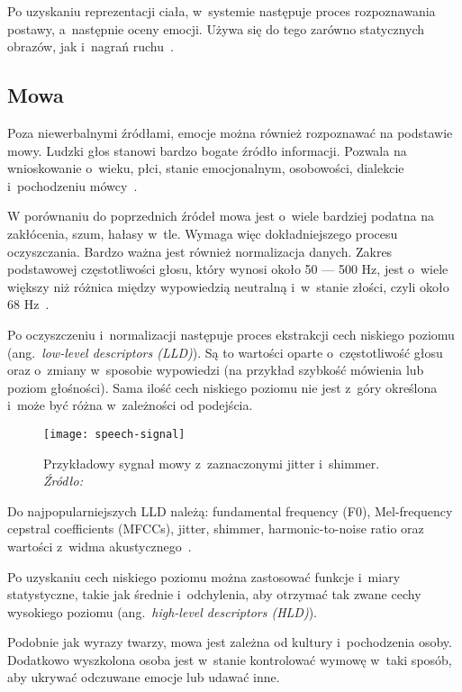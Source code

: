 Po uzyskaniu reprezentacji ciała, w~systemie następuje proces rozpoznawania postawy, a~następnie oceny emocji.
Używa się do tego zarówno statycznych obrazów, jak i~nagrań ruchu~\cite{Noroozi2021, Kleinsmith2013}.


\subsection{Mowa}\label{subsec:mowa}

Poza niewerbalnymi źródłami, emocje można również rozpoznawać na podstawie mowy.
Ludzki głos stanowi bardzo bogate źródło informacji.
Pozwala na wnioskowanie o~wieku, płci, stanie emocjonalnym, osobowości, dialekcie i~pochodzeniu mówcy~\cite{Wani2021}.

W porównaniu do poprzednich źródeł mowa jest o~wiele bardziej podatna na zakłócenia, szum, hałasy w~tle.
Wymaga więc dokładniejszego procesu oczyszczania.
Bardzo ważna jest również normalizacja danych.
Zakres podstawowej częstotliwości głosu, który wynosi około 50 — 500 Hz, jest o~wiele większy niż różnica między wypowiedzią neutralną i~w~stanie złości, czyli około 68 Hz~\cite{Calvo2015}.

Po oczyszczeniu i~normalizacji następuje proces ekstrakcji cech niskiego poziomu (ang.~\textit{low-level descriptors (LLD)}).
Są to wartości oparte o~częstotliwość głosu oraz o~zmiany w~sposobie wypowiedzi (na przykład szybkość mówienia lub poziom głośności).
Sama ilość cech niskiego poziomu nie jest z~góry określona i~może być różna w~zależności od podejścia.

\begin{figure}[h]
    \centering
    \texttt{[image: speech-signal]}
    \caption{Przykładowy sygnał mowy z~zaznaczonymi jitter i~shimmer. \textit{Źródło:~\cite{Teixeira2013}}}
    \label{fig:speech-signal}
\end{figure}

Do najpopularniejszych LLD należą: fundamental frequency (F0), Mel-frequency cepstral coefficients (MFCCs), jitter, shimmer, harmonic-to-noise ratio oraz wartości z~widma akustycznego~\cite{Calvo2015, Abdelwahab2014}.

Po uzyskaniu cech niskiego poziomu można zastosować funkcje i~miary statystyczne, takie jak średnie i~odchylenia, aby otrzymać tak zwane cechy wysokiego poziomu (ang.~\textit{high-level descriptors (HLD)}).

Podobnie jak wyrazy twarzy, mowa jest zależna od kultury i~pochodzenia osoby.
Dodatkowo wyszkolona osoba jest w~stanie kontrolować wymowę w~taki sposób, aby ukrywać odczuwane emocje lub udawać inne.

